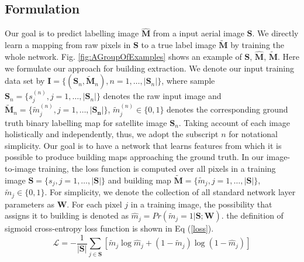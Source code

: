 \documentclass[runningheads]{llncs}
\begin{document}
\subsection{Formulation}
   Our goal is to predict labelling image $\mathbf{\hat{M}}$ from a  input aerial image $\mathbf{S}$.  We directly learn a mapping from raw pixels in $\mathbf{S}$ to a true label image  $\mathbf{\tilde{M}}$ by training the whole network. Fig. \ref{fig:AGroupOfExamples} shows an example of $\mathbf{S}$, $\mathbf{\hat{M}}$, $\mathbf{\tilde{M}}$. Here we formulate our approach for building extraction. We denote our input training data set by $\mathbf{I} = \{(\mathbf{S}_{n},\mathbf{\tilde{M}}_{n}),n = 1,\ldots,\vert \mathbf{S}_n \vert \}$, where sample $\mathbf{S}_{n} = \{s_{j}^{(n)}, j = 1,\ldots,\vert \mathbf{S}_n \vert \}$ denotes the raw input image and  $\mathbf{\tilde{M}}_{n} = \{\tilde{m}_{j}^{(n)}, j = 1,\ldots,\vert \mathbf{S_n} \vert\}$, $\tilde{m}_j^{(n)} \in \{0,1\}$ denotes the corresponding ground truth binary labelling map for satellite image $\mathbf{S}_{n}$.  Taking account of each image holistically and independently, thus, we adopt the subscript $n$ for notational simplicity. Our goal is to have a network that learns features from which it is possible to produce building maps approaching the ground truth. In our image-to-image training, the loss function is computed over all pixels in a training image $\mathbf{S} = \{s_{j}, j = 1,\ldots,\vert \mathbf{S} \vert\}$ and building map $\mathbf{\tilde{M}} = \{\tilde{m}_{j}, j = 1,\ldots,\vert \mathbf{S} \vert\}$, $\tilde{m}_j \in \{0,1\}$.
For simplicity, we denote the collection of all standard network layer parameters as $\mathbf{W}$. For each pixel $j$ in a training image, the possibility that assigns it to building is denoted as $\hat{m}_j = Pr(\tilde{m}_j = 1|\mathbf{S};\mathbf{W})$. the definition of sigmoid cross-entropy loss function is shown in Eq (\ref{loss}).
\begin{equation}
	\label{loss}
    \mathcal{L} = - \frac{1}{\vert \mathbf{S} \vert} \sum_{j \in \mathbf{S}} \left[ \tilde{m}_j \log{\hat{m}_j} + (1 - \tilde{m}_j)\log{(1 - \hat{m}_j)} \right]
\end{equation}

\end{document}
